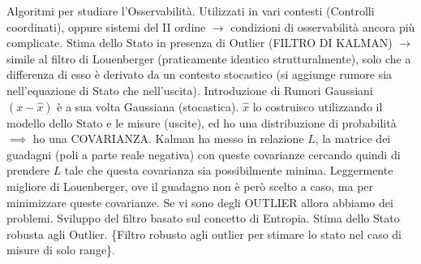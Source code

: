 Algoritmi per studiare l'Osservabilità. Utilizzati in vari contesti (Controlli coordinati), oppure sistemi del II ordine $\rightarrow$ condizioni di osservabilità ancora più complicate. Stima dello Stato in presenza di Outlier (FILTRO DI KALMAN) $\rightarrow$ simile al filtro di Louenberger (praticamente identico strutturalmente), solo che a differenza di esso è derivato da un contesto stocastico (si aggiunge rumore sia nell'equazione di Stato che nell'uscita). Introduzione di Rumori Gaussiani $(x-\hat{x})$ è a sua volta Gaussiana (stocastica). $\hat{x}$ lo costruisco utilizzando il modello dello Stato e le misure (uscite), ed ho una distribuzione di probabilità $\implies$ ho una COVARIANZA. Kalman ha messo in relazione $L$, la matrice dei guadagni (poli a parte reale negativa) con queste covarianze cercando quindi di prendere $L$ tale che questa covarianza sia possibilmente minima. Leggermente migliore di Louenberger, ove il guadagno non è però scelto a caso, ma per minimizzare queste covarianze. Se vi sono degli OUTLIER allora abbiamo dei problemi. Sviluppo del filtro basato sul concetto di Entropia. Stima dello Stato robusta agli Outlier. \{Filtro robusto agli outlier per stimare lo stato nel caso di misure di solo range\}.